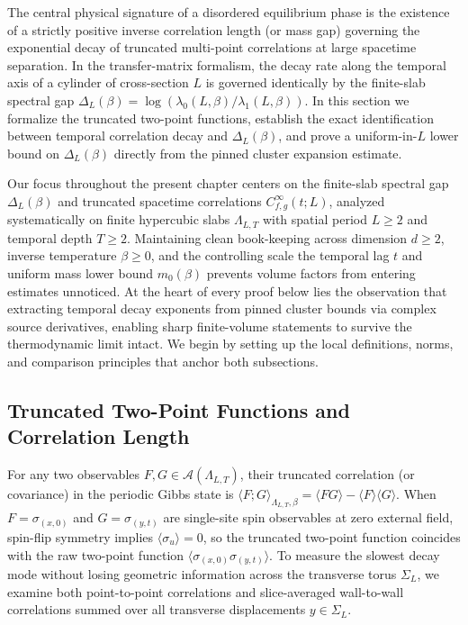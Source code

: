 \documentclass[11pt]{article}
\theoremstyle{definition}
\begin{document}
The central physical signature of a disordered equilibrium phase is the existence of
a strictly positive inverse correlation length (or mass gap) governing the
exponential decay of truncated multi-point correlations at large spacetime
separation. In the transfer-matrix formalism, the decay rate along the temporal axis
of a cylinder of cross-section $L$ is governed identically by the finite-slab
spectral gap $\Delta_L(\beta) = \log(\lambda_0(L, \beta) / \lambda_1(L, \beta))$. In
this section we formalize the truncated two-point functions, establish the exact
identification between temporal correlation decay and $\Delta_L(\beta)$, and prove a
uniform-in-$L$ lower bound on $\Delta_L(\beta)$ directly from the pinned cluster
expansion estimate.

Our focus throughout the present chapter centers on the finite-slab spectral gap
$\Delta_L(\beta)$ and truncated spacetime correlations $C_{f,g}^\infty(t; L)$,
analyzed systematically on finite hypercubic slabs $\Lambda_{L,T}$ with spatial
period $L \ge 2$ and temporal depth $T \ge 2$. Maintaining clean book-keeping across
dimension $d \ge 2$, inverse temperature $\beta \ge 0$, and the controlling scale
the temporal lag $t$ and uniform mass lower bound $m_0(\beta)$ prevents volume
factors from entering estimates unnoticed. At the heart of every proof below lies
the observation that extracting temporal decay exponents from pinned cluster bounds
via complex source derivatives, enabling sharp finite-volume statements to survive
the thermodynamic limit intact. We begin by setting up the local definitions, norms,
and comparison principles that anchor both subsections.

\subsection{Truncated Two-Point Functions and Correlation Length}
\label{subsec:s08a}

For any two observables $F, G \in \mathcal{A}(\Lambda_{L,T})$, their truncated
correlation (or covariance) in the periodic Gibbs state is $\langle F ; G
\rangle_{\Lambda_{L,T},\beta} = \langle F G \rangle - \langle F \rangle \langle G
\rangle$. When $F = \sigma_{(x, 0)}$ and $G = \sigma_{(y, t)}$ are single-site spin
observables at zero external field, spin-flip symmetry implies $\langle \sigma_u
\rangle = 0$, so the truncated two-point function coincides with the raw two-point
function $\langle \sigma_{(x,0)} \sigma_{(y,t)} \rangle$. To measure the slowest
decay mode without losing geometric information across the transverse torus
$\Sigma_L$, we examine both point-to-point correlations and slice-averaged
wall-to-wall correlations summed over all transverse displacements $y \in \Sigma_L$.
\end{document}

